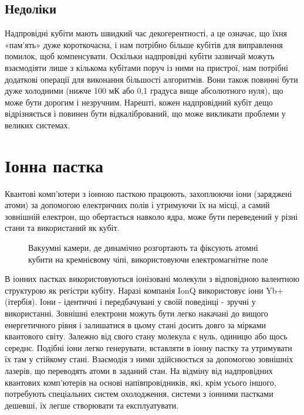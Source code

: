 \documentclass[a4paper,14pt]{extreport}
\begin{document}
\section{Недоліки}
Надпровідні кубіти мають швидкий час декогерентності, а це означає, що їхня «пам’ять» дуже короткочасна, і нам потрібно більше кубітів для виправлення помилок, щоб компенсувати. Оскільки надпровідні кубіти зазвичай можуть взаємодіяти лише з кількома кубітами поруч із ними на пристрої, нам потрібні додаткові операції для виконання більшості алгоритмів. Вони також повинні бути дуже холодними (нижче 100 мК або 0,1 градуса вище абсолютного нуля), що може бути дорогим і незручним. Нарешті, кожен надпровідний кубіт дещо відрізняється і повинен бути відкалібрований, що може викликати проблеми у великих системах.
\chapter{Іонна пастка}\par 
Квантові комп’ютери з іонною пасткою працюють, захоплюючи іони (заряджені атоми) за допомогою електричних полів і утримуючи їх на місці, а самий зовнішній електрон, що обертається навколо ядра, може бути переведений у різні стани та використаний як кубіт.
\begin{figure}[h!]
\caption{Вакуумні камери, де динамічно розгортають та фіксують атомні кубити на кремнієвому чіпі, використовуючи електромагнітне поле}

\end{figure}

В іонних пастках використовуються іонізовані молекули з відповідною валентною структурою як регістри кубіту. Наразі компанія IonQ використовує іони Yb+ (ітербія). Іони - ідентичні і передбачувані у своїй поведінці - зручні у використанні. Зовнішні електрони можуть бути легко накачані до вищого енергетичного рівня і залишатися в цьому стані досить довго за мірками квантового світу. Залежно від свого стану молекула є нуль, одиницю або щось середнє. Подібні іони легко генерувати, вставляти в іонну пастку та утримувати їх там у стійкому стані. Взаємодія з ними здійснюється за допомогою зовнішніх лазерів, що переводять атоми в заданий стан. На відміну від надпровідних квантових комп'ютерів на основі напівпровідників, які, крім усього іншого, потребують спеціальних систем охолодження, системи з іонними пастками дешевші, їх легше створювати та експлуатувати.\\
\end{document}
